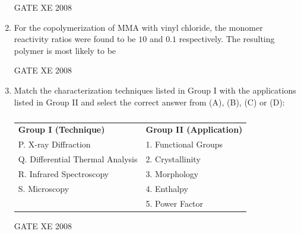 \documentclass[12pt]{article}
\begin{document}
\begin{enumerate}[label=Q\arabic*.]
GATE XE 2008

\item For the copolymerization of MMA with vinyl chloride, the monomer reactivity ratios were found to be $10$ and $0.1$ respectively. The resulting polymer is most likely to be 

\begin{enumerate}[label=(\Alph*)]
\end{enumerate}

 GATE XE 2008

\item Match the characterization techniques listed in Group I with the applications listed in Group II and select the correct answer from (A), (B), (C) or (D):

\begin{table}[H]     \centering     \caption{}     \label{}     \begin{tabular}{ll}
\textbf{Group I (Technique)} & \textbf{Group II (Application)} \\
P. X-ray Diffraction & 1. Functional Groups \\
Q. Differential Thermal Analysis & 2. Crystallinity \\
R. Infrared Spectroscopy & 3. Morphology \\
S. Microscopy & 4. Enthalpy \\
 & 5. Power Factor \\
\end{tabular} \end{table}

\begin{enumerate}[label=(\Alph*)]
\end{enumerate}

GATE XE 2008


\end{enumerate}
\end{document}
